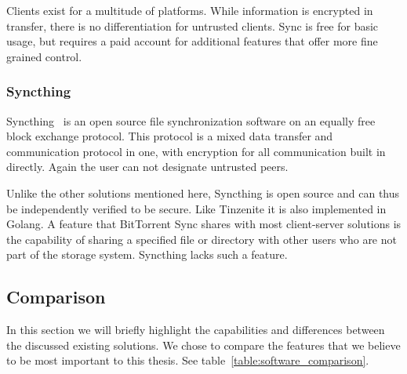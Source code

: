 Clients exist for a multitude of platforms.
While information is encrypted in transfer, there is no differentiation for untrusted clients.
Sync is free for basic usage, but requires a paid account for additional features that offer more fine grained control.

\subsubsection{Syncthing}
\label{subs:Syncthing}

Syncthing~\cite{web:site:synthing} is an open source file synchronization software on an equally free block exchange protocol.
This protocol is a mixed data transfer and communication protocol in one, with encryption for all communication built in directly.
Again the user can not designate untrusted peers.

Unlike the other solutions mentioned here, Syncthing is open source and can thus be independently verified to be secure.
Like Tinzenite it is also implemented in Golang.
A feature that BitTorrent Sync shares with most client-server solutions is the capability of sharing a specified file or directory with other users who are not part of the storage system.
Syncthing lacks such a feature.

\subsection{Comparison}
\label{sub:Comparison}

In this section we will briefly highlight the capabilities and differences between the discussed existing solutions.
We chose to compare the features that we believe to be most important to this thesis.
See table~\ref{table:software_comparison}.

